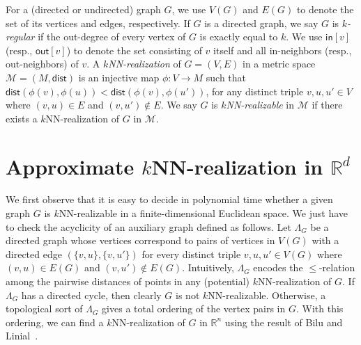 \documentclass[english]{lipics-v2021}
\begin{document}
For a (directed or undirected) graph $G$, we use $V(G)$ and $E(G)$ to denote the set of its vertices and edges, respectively. If $G$ is a directed graph, we say $G$ is \textit{$k$-regular} if the out-degree of every vertex of $G$ is exactly equal to $k$. We use $\mathsf{in}[v]$ (resp., $\mathsf{out}[v]$) to denote the set consisting of $v$ itself and all in-neighbors (resp., out-neighbors) of $v$.
A \textit{$k$NN-realization} of $G = (V,E)$ in a metric space $\mathcal{M} = (M,\mathsf{dist})$ is an injective map $\phi: V \rightarrow M$ such that  $\mathsf{dist}(\phi(v),\phi(u)) < \mathsf{dist}(\phi(v),\phi(u'))$, for any distinct triple $v,u,u' \in V$ where $(v,u) \in E$ and $(v,u') \notin E$.
We say $G$ is \textit{$k$NN-realizable} in $\mathcal{M}$ if there exists a $k$NN-realization of $G$ in $\mathcal{M}$.

\section{Approximate \texorpdfstring{$k$}{k}NN-realization in \texorpdfstring{$\mathbb{R}^d$}{Rd}}

We first observe that it is easy to decide in polynomial time whether a given graph $G$ is $k$NN-realizable in a finite-dimensional Euclidean space.
We just have to check the acyclicity of an auxiliary graph defined as follows. Let $\varLambda_G$ be a directed graph whose vertices correspond to pairs of vertices in $V(G)$ with a directed edge $(\{v,u\},\{v,u'\})$ for every distinct triple $v,u,u' \in V(G)$ where $(v,u) \in E(G)$ and $(v,u') \notin E(G)$.
Intuitively, $\varLambda_G$ encodes the $\leq$-relation among the pairwise distances of points in any (potential) $k$NN-realization of $G$.
If $\varLambda_G$ has a directed cycle, then clearly $G$ is not $k$NN-realizable.
Otherwise, a topological sort of $\varLambda_G$ gives a total ordering of the vertex pairs in $G$.
With this ordering, we can find a $k$NN-realization of $G$ in $\mathbb{R}^n$ using the result of Bilu and Linial~\cite{bilu2005}.
\end{document}
